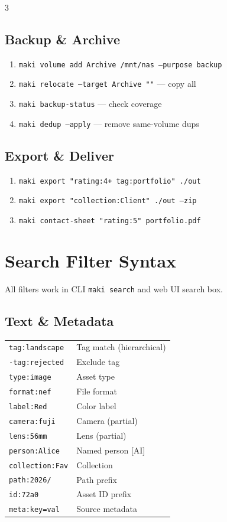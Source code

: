 \documentclass[a4paper,landscape,8pt]{article}
\newcommand{\cmd}[1]{\texttt{\footnotesize #1}}
\newcommand{\ai}{\textcolor{maki-teal}{\scriptsize [AI]}}
\begin{document}
\begin{multicols}{3}
\subsection{Backup \& Archive}
\begin{enumerate}[leftmargin=1.5em]
\item \cmd{maki volume add Archive /mnt/nas --purpose backup}
\item \cmd{maki relocate --target Archive ""} — copy all
\item \cmd{maki backup-status} — check coverage
\item \cmd{maki dedup --apply} — remove same-volume dups
\end{enumerate}

\subsection{Export \& Deliver}
\begin{enumerate}[leftmargin=1.5em]
\item \cmd{maki export "rating:4+ tag:portfolio" ./out}
\item \cmd{maki export "collection:Client" ./out --zip}
\item \cmd{maki contact-sheet "rating:5" portfolio.pdf}
\end{enumerate}

\columnbreak

\section{Search Filter Syntax}

All filters work in CLI \cmd{maki search} and web UI search box.

\subsection{Text \& Metadata}
\begin{tabularx}{\columnwidth}{@{}lX@{}}
\cmd{tag:landscape} & Tag match (hierarchical) \\
\cmd{-tag:rejected} & Exclude tag \\
\cmd{type:image} & Asset type \\
\cmd{format:nef} & File format \\
\cmd{label:Red} & Color label \\
\cmd{camera:fuji} & Camera (partial) \\
\cmd{lens:56mm} & Lens (partial) \\
\cmd{person:Alice} & Named person \ai \\
\cmd{collection:Fav} & Collection \\
\cmd{path:2026/} & Path prefix \\
\cmd{id:72a0} & Asset ID prefix \\
\cmd{meta:key=val} & Source metadata \\
\end{tabularx}


\end{multicols}
\end{document}
